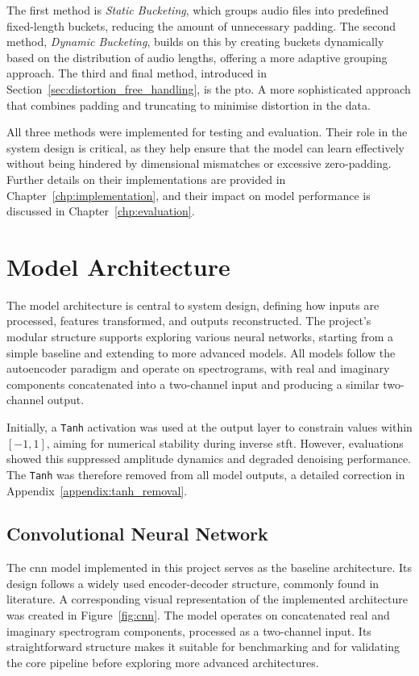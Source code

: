 The first method is \textit{Static Bucketing}, which groups audio files into predefined fixed-length buckets, reducing the amount of unnecessary padding. The second method, \textit{Dynamic Bucketing}, builds on this by creating buckets dynamically based on the distribution of audio lengths, offering a more adaptive grouping approach. The third and final method, introduced in Section~\ref{sec:distortion_free_handling}, is the \gls{pto}. A more sophisticated approach that combines padding and truncating to minimise distortion in the data.

All three methods were implemented for testing and evaluation. Their role in the system design is critical, as they help ensure that the model can learn effectively without being hindered by dimensional mismatches or excessive zero-padding. Further details on their implementations are provided in Chapter~\ref{chp:implementation}, and their impact on model performance is discussed in Chapter~\ref{chp:evaluation}.

\section{Model Architecture}
\label{sec:model_architecture}

The model architecture is central to system design, defining how inputs are processed, features transformed, and outputs reconstructed. The project’s modular structure supports exploring various neural networks, starting from a simple baseline and extending to more advanced models. All models follow the autoencoder paradigm and operate on spectrograms, with real and imaginary components concatenated into a two-channel input and producing a similar two-channel output.

Initially, a \texttt{Tanh} activation was used at the output layer to constrain values within $[-1, 1]$, aiming for numerical stability during inverse \gls{stft}. However, evaluations showed this suppressed amplitude dynamics and degraded denoising performance. The \texttt{Tanh} was therefore removed from all model outputs, a detailed correction in Appendix~\ref{appendix:tanh_removal}.

\subsection{Convolutional Neural Network}
\label{sec:cnn}

The \gls{cnn} model implemented in this project serves as the baseline architecture. Its design follows a widely used encoder-decoder structure, commonly found in literature. A corresponding visual representation of the implemented architecture was created in Figure~\ref{fig:cnn}. The model operates on concatenated real and imaginary spectrogram components, processed as a two-channel input. Its straightforward structure makes it suitable for benchmarking and for validating the core pipeline before exploring more advanced architectures.

